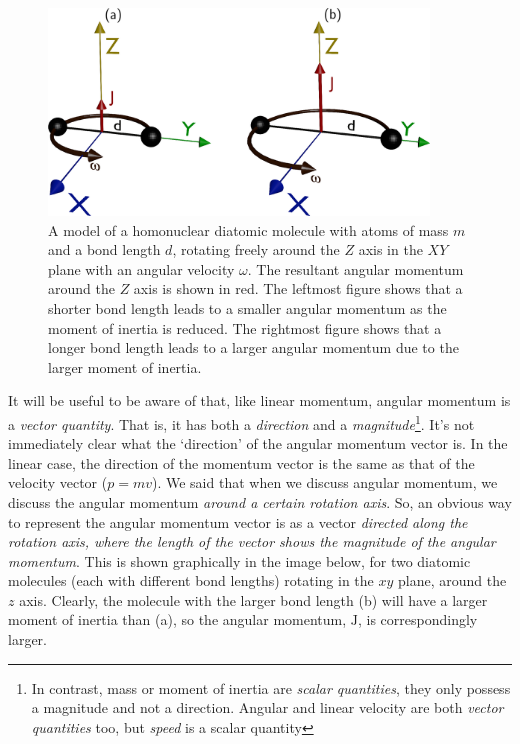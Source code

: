 \documentclass{memoir}[11pt,oneside,a4paper,openany]
\newcommand{\Jc}{\ensuremath{\mathrm{J}}}
\begin{document}
\begin{figure}[h]
	\centering
	\includegraphics[width=0.9\textwidth]{angular_momenta}
	\caption{A model of a homonuclear diatomic molecule with atoms of mass $m$ and a bond length $d$, rotating freely around the $Z$ axis in the $XY$ plane with an angular velocity $\omega$. The resultant angular momentum around the $Z$ axis is shown in red. The leftmost figure shows that a shorter bond length leads to a smaller angular momentum as the moment of inertia is reduced. The rightmost figure shows that a longer bond length leads to a larger angular momentum due to the larger moment of inertia.}\label{fig:angular_momenta}
\end{figure}
It will be useful to be aware of that, like linear momentum, angular momentum is a \emph{vector quantity}. That is, it has both a \emph{direction} and a \emph{magnitude}\footnote{In contrast, mass or moment of inertia are \emph{scalar quantities}, they only possess a magnitude and not a direction. Angular and linear velocity are both \emph{vector quantities} too, but \emph{speed} is a scalar quantity}. It's not immediately clear what the `direction' of the angular momentum vector is. In the linear case, the direction of the momentum vector is the same as that of the velocity vector ($p=mv$). We said that when we discuss angular momentum, we discuss the angular momentum \emph{around a certain rotation axis}. So, an obvious way to represent the angular momentum vector is as a vector \emph{directed along the rotation axis, where the length of the vector shows the magnitude of the angular momentum}. This is shown graphically in the image below, for two diatomic molecules (each with different bond lengths) rotating in the $xy$ plane, around the $z$ axis. Clearly, the molecule with the larger bond length (b) will have a larger moment of inertia than (a), so the angular momentum, $\Jc$, is correspondingly larger. 
\end{document}
